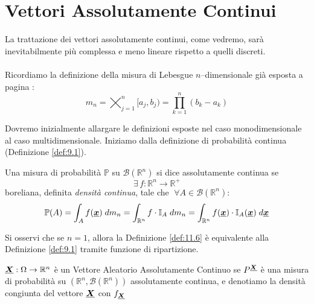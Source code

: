 \section{Vettori Assolutamente Continui}
La trattazione dei vettori assolutamente continui, come vedremo, sarà inevitabilmente più complessa e meno lineare rispetto a quelli discreti.\\
\\
Ricordiamo la definizione della misura di Lebesgue $n$--dimensionale già esposta a pagina \pageref{leb_ndim}:
\[m_n = \bigtimes_{j=1}^n[a_j, b_j) = \prod_{k=1}^n(b_k-a_k)\]

\medskip
\noindent Dovremo inizialmente allargare le definizioni esposte nel caso monodimensionale al caso multidimensionale. Iniziamo dalla definizione di probabilità continua (Definizione \ref{def:9.1}).

\begin{definizione}
\label{def:11.6}
    Una misura di probabilità $\mathbb{P}$ su $\mathcal{B}(\mathbb{R}^n)$ si dice assolutamente continua se
    \[\exists\,f:\mathbb{R}^n\to \mathbb{R}^+\]
    boreliana, definita \textit{densità continua}, tale che $\;\forall A\in \mathcal{B}(\mathbb{R}^n):$
    \[\mathbb{P}(A) = \int_Af(\underline{{\boldsymbol{x}}})\;dm_n = \int_{\mathbb{R}^n} f\cdot \mathbb{I}_A\;dm_n = \int_{\mathbb{R}^n} f(\underline{{\boldsymbol{x}}})\cdot\mathbb{I}_A(\underline{{\boldsymbol{x}}})\;d\underline{{\boldsymbol{x}}}\]
\end{definizione}

Si osservi che se $n=1$, allora la Definizione \ref{def:11.6} è equivalente alla Definizione \ref{def:9.1} tramite funzione di ripartizione.

\begin{definizione}
    $\underline{{\boldsymbol{X}}}:\Omega\to\mathbb{R}^n$ è un Vettore Aleatorio Assolutamente Continuo se $P^{\underline{{\boldsymbol{X}}}}$ è una misura di probabilità su $(\mathbb{R}^n, \mathcal{B}(\mathbb{R}^n))$ assolutamente continua, e denotiamo la densità congiunta del vettore $\underline{{\boldsymbol{X}}}$ con $f_{\underline{{\boldsymbol{X}}}}$
\end{definizione}

